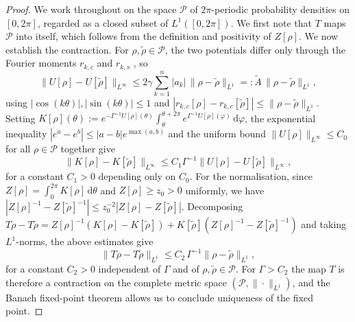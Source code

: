 \documentclass[10pt,a4paper]{amsart}
\begin{document}
\begin{proof}
We work throughout on the space $\mathcal{P}$ of $2\pi$-periodic probability densities on $[0,2\pi]$, regarded as a closed subset of $L^1([0,2\pi])$. We first note that $T$ maps $\mathcal{P}$ into itself, which follows from the definition and positivity of $Z[\rho]$. We now establish the contraction. For $\rho,\tilde\rho\in\mathcal{P}$, the two potentials differ only through the Fourier moments $r_{k,c}$ and $r_{k,s}$ , so
\begin{equation}\label{eq:U-Lip}
    \|U[\rho]-U[\tilde\rho]\|_{L^\infty} \leq 2\gamma\sum_{k=1}^n |a_k|\,\|\rho-\tilde\rho\|_{L^1} =: \tilde{A}\,\|\rho-\tilde\rho\|_{L^1},
\end{equation}
using $|\cos(k\theta)|,|\sin(k\theta)|\leq 1$ and $|r_{k,c}[\rho]-r_{k,c}[\tilde\rho]|\leq\|\rho-\tilde\rho\|_{L^1}$. Setting $K[\rho](\theta) := e^{-\Gamma^{-1}U[\rho](\theta)}\int_\theta^{\theta+2\pi}e^{\Gamma^{-1}U[\rho](\varphi)}\,\mathrm{d}\varphi$, the exponential inequality $|e^a - e^b| \leq |a-b|e^{\max(a,b)}$ and the uniform bound $\|U[\rho]\|_{L^\infty}\leq C_0$ for all $\rho\in\mathcal{P}$ together give
\[
    \|K[\rho]-K[\tilde\rho]\|_{L^\infty} \leq C_1\Gamma^{-1}\|U[\rho]-U[\tilde\rho]\|_{L^\infty},
\]
for a constant $C_1 > 0$ depending only on $C_0$. For the normalisation, since $Z[\rho] = \int_0^{2\pi}K[\rho]\,\mathrm{d}\theta$ and $Z[\rho]\geq z_0>0$ uniformly, we have $|Z[\rho]^{-1} - Z[\tilde\rho]^{-1}|\leq z_0^{-2}|Z[\rho]-Z[\tilde\rho]|$. Decomposing $T\rho - T\tilde\rho = Z[\rho]^{-1}(K[\rho]-K[\tilde\rho]) + K[\tilde\rho](Z[\rho]^{-1}-Z[\tilde\rho]^{-1})$ and taking $L^1$-norms, the above estimates give
\[
    \|T\rho - T\tilde\rho\|_{L^1} \leq C_2\,\Gamma^{-1}\|\rho-\tilde\rho\|_{L^1},
\]
for a constant $C_2>0$ independent of $\Gamma$ and of $\rho,\tilde\rho\in\mathcal{P}$. For $\Gamma > C_2$ the map $T$ is therefore a contraction on the complete metric space $(\mathcal{P},\|\cdot\|_{L^1})$, and the Banach fixed-point theorem allows us to conclude uniqueness of the fixed point.
\end{proof}
\end{document}
